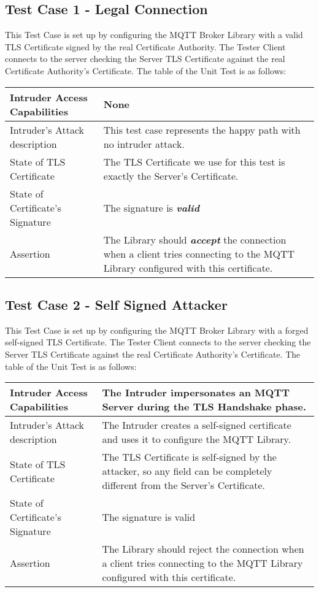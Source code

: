 \documentclass[binding=0.6cm,noexaminfo]{sapthesis}
\begin{document}
\subsection{Test Case 1 - Legal Connection}
This Test Case is set up by configuring the MQTT Broker Library with a valid TLS Certificate signed by the real Certificate Authority. The Tester Client connects to the server checking the Server TLS Certificate against the real Certificate Authority’s Certificate. The table of the Unit Test is as follows:

\begin{center}
\begin{tabular}{| p{6cm} | p{6cm} |}
\hline
Intruder Access Capabilities & None \\
\hline
Intruder’s Attack description & This test case represents the happy path with no intruder attack. \\
\hline
State of TLS Certificate & The TLS Certificate we use for this test is exactly the Server’s Certificate. \\
\hline
State of Certificate’s Signature & The signature is \textbf{\textit{valid}} \\
\hline
Assertion & The Library should \textbf{\textit{accept}} the connection when a client tries connecting to the MQTT Library configured with this certificate. \\
\hline
\end{tabular}
\end{center}

\subsection{Test Case 2 - Self Signed Attacker}
This Test Case is set up by configuring the MQTT Broker Library with a forged self-signed TLS Certificate. The Tester Client connects to the server checking the Server TLS Certificate against the real Certificate Authority’s Certificate. The table of the Unit Test is as follows:

\begin{center}
\begin{tabular}{| p{6cm} | p{6cm} |}
\hline
Intruder Access Capabilities & The Intruder impersonates an MQTT Server during the TLS Handshake phase. \\
\hline
Intruder’s Attack description & The Intruder creates a self-signed certificate and uses it to configure the MQTT Library. \\
\hline
State of TLS Certificate & The TLS Certificate is self-signed by the attacker, so any field can be completely different from the Server’s Certificate. \\
\hline
State of Certificate’s Signature & The signature is valid \\
\hline
Assertion & The Library should reject the connection when a client tries connecting to the MQTT Library configured with this certificate. \\
\hline
\end{tabular}
\end{center}
\end{document}
